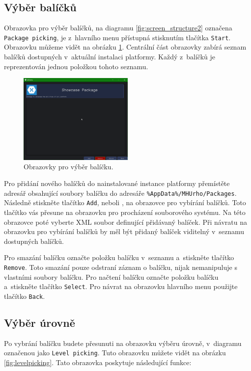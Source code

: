 \subsection{Výběr balíčků}
Obrazovka pro výběr balíčků, na diagramu \ref{fig:screen_structure2} označena \texttt{Package picking}, je z~hlavního menu přístupná stisknutím tlačítka \texttt{Start}. Obrazovku můžeme vidět na obrázku \ref{fig:packagepicking}. Centrální část obrazovky zabírá seznam balíčků dostupných v~aktuální instalaci platformy. Každý z~balíčků je reprezentován jednou položkou tohoto seznamu. 

\begin{figure}[h]
	\centering
	\includegraphics[width=0.5\textwidth]{img/PackagePickingScreen.png}
	\caption{Obrazovky pro výběr balíčku.}
	\label{fig:packagepicking}
\end{figure}

Pro přidání nového balíčků do nainstalované instance platformy přemístěte adresář obsahující soubory balíčku do adresáře \texttt{\%AppData\%/MHUrho/Packages}. Následně stiskněte tlačítko \texttt{Add}, neboli , na obrazovce pro vybírání balíčků. Toto tlačítko vás přesune na obrazovku pro procházení souborového systému. Na této obrazovce poté vyberte XML soubor definující přidávaný balíček. Při návratu na obrazovku pro vybírání balíčků by měl být přidaný balíček viditelný v~seznamu dostupných balíčků.

Pro smazání balíčku označte položku balíčku v~seznamu a~stiskněte tlačítko \texttt{Remove}. Toto smazání pouze odstraní záznam o balíčku, nijak nemanipuluje s vlastními soubory balíčku. Pro načtení balíčku  označte položku balíčku a~stiskněte tlačítko \texttt{Select}. Pro návrat na obrazovku hlavního menu použijte tlačítko \texttt{Back}.

\subsection{Výběr úrovně}
Po vybrání balíčku budete přesunuti na obrazovku výběru úrovně, v~diagramu označenou jako \texttt{Level picking}. Tuto obrazovku můžete vidět na obrázku \ref{fig:levelpicking}. Tato obrazovka poskytuje následující funkce:

